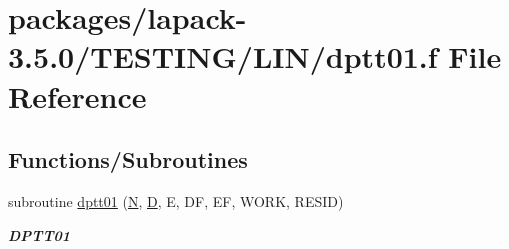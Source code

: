 \hypertarget{dptt01_8f}{}\section{packages/lapack-\/3.5.0/\+T\+E\+S\+T\+I\+N\+G/\+L\+I\+N/dptt01.f File Reference}
\label{dptt01_8f}
\subsection*{Functions/\+Subroutines}
\begin{DoxyCompactItemize}
\item 
subroutine \hyperlink{group__double__lin_gafdae23683d4d7fe43deaa133382d31cf}{dptt01} (\hyperlink{polmisc_8c_a0240ac851181b84ac374872dc5434ee4}{N}, \hyperlink{odrpack_8h_a7dae6ea403d00f3687f24a874e67d139}{D}, E, D\+F, E\+F, W\+O\+R\+K, R\+E\+S\+I\+D)
\begin{DoxyCompactList}\small\item\em {\bfseries D\+P\+T\+T01} \end{DoxyCompactList}\end{DoxyCompactItemize}
